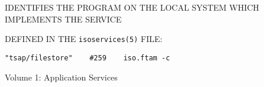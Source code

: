 \begin{bwslide}

\begin{nrtc}
\item	IDENTIFIES THE PROGRAM ON THE LOCAL SYSTEM WHICH IMPLEMENTS THE SERVICE

\item	DEFINED IN THE \verb"isoservices(5)" FILE:
\begin{verbatim}
"tsap/filestore"    #259    iso.ftam -c
\end{verbatim}
\end{nrtc}
\end{bwslide}


\begin{bwslide}

\begin{nrtc}
\item	Volume 1: Application Services
\end{nrtc}
\end{bwslide}
